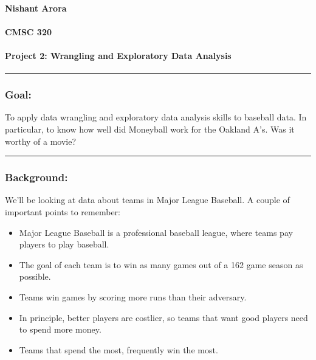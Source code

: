 \documentclass[]{article}
\title{}
\author{}
\date{}
\providecommand{\tightlist}{%
  \setlength{\itemsep}{0pt}\setlength{\parskip}{0pt}}
\let\oldparagraph\paragraph
\renewcommand{\paragraph}[1]{\oldparagraph{#1}\mbox{}}
\begin{document}
\paragraph{Nishant Arora}\label{nishant-arora}

\paragraph{CMSC 320}\label{cmsc-320}

\paragraph{Project 2: Wrangling and Exploratory Data
Analysis}\label{project-2-wrangling-and-exploratory-data-analysis}

\begin{center}\rule{0.5\linewidth}{\linethickness}\end{center}

\subsubsection{Goal:}\label{goal}

To apply data wrangling and exploratory data analysis skills to baseball
data. In particular, to know how well did Moneyball work for the Oakland
A's. Was it worthy of a movie?

\begin{center}\rule{0.5\linewidth}{\linethickness}\end{center}

\subsubsection{Background:}\label{background}

We'll be looking at data about teams in Major League Baseball. A couple
of important points to remember:

\begin{itemize}
\tightlist
\item
  Major League Baseball is a professional baseball league, where teams
  pay players to play baseball.
\item
  The goal of each team is to win as many games out of a 162 game season
  as possible.
\item
  Teams win games by scoring more runs than their adversary.
\item
  In principle, better players are costlier, so teams that want good
  players need to spend more money.
\item
  Teams that spend the most, frequently win the most.
\end{itemize}
\end{document}
